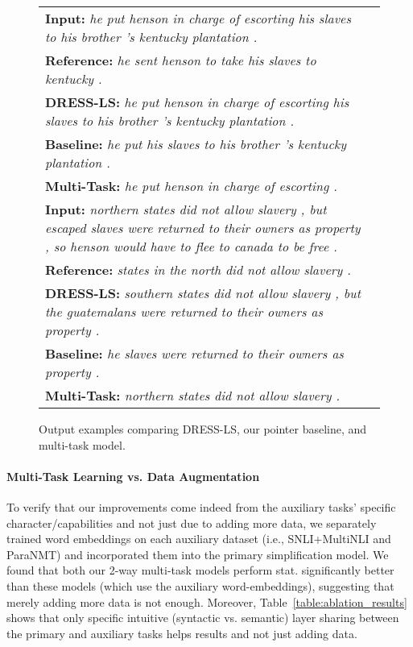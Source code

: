 \documentclass[11pt]{article}
\begin{document}
\begin{wrapfigure}[14]{R}{0.57\textwidth}
    \vspace{-16pt}
\begin{small}
\begin{tabularx}{\linewidth}{|X|l|}
\hline
\textbf{Input:} \emph{he put henson in charge of escorting his slaves to his brother 's kentucky plantation .} \\
\hdashline
\textbf{Reference:} \emph{he sent henson to take his slaves to kentucky .}\\
\textbf{DRESS-LS:} \emph{he put henson in charge of escorting his slaves to his brother 's kentucky plantation .} \\
\textbf{Baseline:} \emph{he put his slaves to his brother 's kentucky plantation .} \\
\textbf{Multi-Task:} \emph{he put henson in charge of escorting .}\\
\hline
\hline
\textbf{Input:} \emph{northern states did not allow slavery , but escaped slaves were returned to their owners as property , so henson would have to flee to canada to be free .} \\
\hdashline
\textbf{Reference:} \emph{states in the north did not allow slavery .}\\
\textbf{DRESS-LS:} \emph{southern states did not allow slavery , but the guatemalans were returned to their owners as property .} \\
\textbf{Baseline:} \emph{he slaves were returned to their owners as property .} \\
\textbf{Multi-Task:} \emph{northern states did not allow slavery .}\\
\hline
\end{tabularx}
 \vspace{-12pt}
\caption{Output examples comparing DRESS-LS, our pointer baseline, and multi-task model.}
\label{fig:examples}
\vspace{-5pt}
\end{small}
\end{wrapfigure}
\paragraph{Multi-Task Learning vs. Data Augmentation}
To verify that our improvements come indeed from the auxiliary tasks' specific character/capabilities and not just due to adding more data, we separately trained word embeddings on each auxiliary dataset (i.e., SNLI+MultiNLI and ParaNMT) and incorporated them into the primary simplification model. We found that both our 2-way multi-task models perform stat. significantly better than these models (which use the auxiliary word-embeddings), suggesting that merely adding more data is not enough. Moreover, Table~\ref{table:ablation_results} shows that only specific intuitive (syntactic vs. semantic) layer sharing between the primary and auxiliary tasks helps results and not just adding data.
\end{document}
